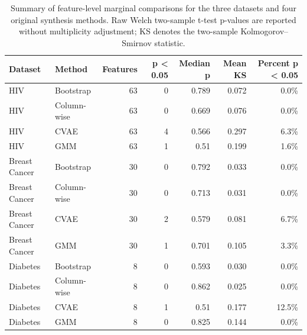 \begin{table}[!htbp]
\centering
\small
\setlength{\tabcolsep}{4pt}

\caption{Summary of feature-level marginal comparisons for the three datasets and four original synthesis methods. Raw Welch two-sample t-test p-values are reported without multiplicity adjustment; KS denotes the two-sample Kolmogorov--Smirnov statistic.}
\label{tab:marginal-summary}
\begin{tabular}{@{}llrrrrr@{}}
\toprule
Dataset & Method & Features & p < 0.05 & Median p & Mean KS & Percent p < 0.05 \\
\midrule
HIV & Bootstrap & 63 & 0 & 0.789 & 0.072 & 0.0\% \\
HIV & Column-wise & 63 & 0 & 0.669 & 0.076 & 0.0\% \\
HIV & CVAE & 63 & 4 & 0.566 & 0.297 & 6.3\% \\
HIV & GMM & 63 & 1 & 0.51 & 0.199 & 1.6\% \\
Breast Cancer & Bootstrap & 30 & 0 & 0.792 & 0.033 & 0.0\% \\
Breast Cancer & Column-wise & 30 & 0 & 0.713 & 0.031 & 0.0\% \\
Breast Cancer & CVAE & 30 & 2 & 0.579 & 0.081 & 6.7\% \\
Breast Cancer & GMM & 30 & 1 & 0.701 & 0.105 & 3.3\% \\
Diabetes & Bootstrap & 8 & 0 & 0.593 & 0.030 & 0.0\% \\
Diabetes & Column-wise & 8 & 0 & 0.862 & 0.025 & 0.0\% \\
Diabetes & CVAE & 8 & 1 & 0.51 & 0.177 & 12.5\% \\
Diabetes & GMM & 8 & 0 & 0.825 & 0.144 & 0.0\% \\
\bottomrule
\end{tabular}

\end{table}
